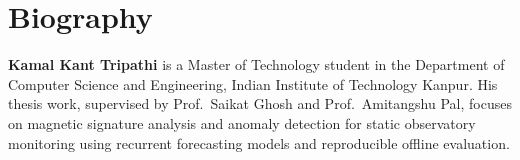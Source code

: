 \chapter*{Biography}
\thispagestyle{plain}

\noindent\textbf{Kamal Kant Tripathi} is a Master of Technology student in the Department of Computer Science and Engineering, Indian Institute of Technology Kanpur. His thesis work, supervised by Prof.\ Saikat Ghosh and Prof.\ Amitangshu Pal, focuses on magnetic signature analysis and anomaly detection for static observatory monitoring using recurrent forecasting models and reproducible offline evaluation.
